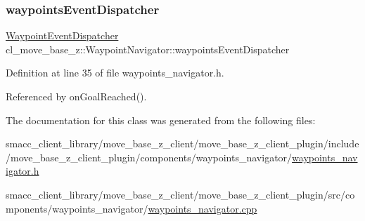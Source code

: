 \subsubsection{\texorpdfstring{waypoints\+Event\+Dispatcher}{waypointsEventDispatcher}}
{\footnotesize\ttfamily \hyperlink{classcl__move__base__z_1_1WaypointEventDispatcher}{Waypoint\+Event\+Dispatcher} cl\+\_\+move\+\_\+base\+\_\+z\+::\+Waypoint\+Navigator\+::waypoints\+Event\+Dispatcher}



Definition at line 35 of file waypoints\+\_\+navigator.\+h.



Referenced by on\+Goal\+Reached().



The documentation for this class was generated from the following files\+:\begin{DoxyCompactItemize}
\item 
smacc\+\_\+client\+\_\+library/move\+\_\+base\+\_\+z\+\_\+client/move\+\_\+base\+\_\+z\+\_\+client\+\_\+plugin/include/move\+\_\+base\+\_\+z\+\_\+client\+\_\+plugin/components/waypoints\+\_\+navigator/\hyperlink{waypoints__navigator_8h}{waypoints\+\_\+navigator.\+h}\item 
smacc\+\_\+client\+\_\+library/move\+\_\+base\+\_\+z\+\_\+client/move\+\_\+base\+\_\+z\+\_\+client\+\_\+plugin/src/components/waypoints\+\_\+navigator/\hyperlink{waypoints__navigator_8cpp}{waypoints\+\_\+navigator.\+cpp}\end{DoxyCompactItemize}
